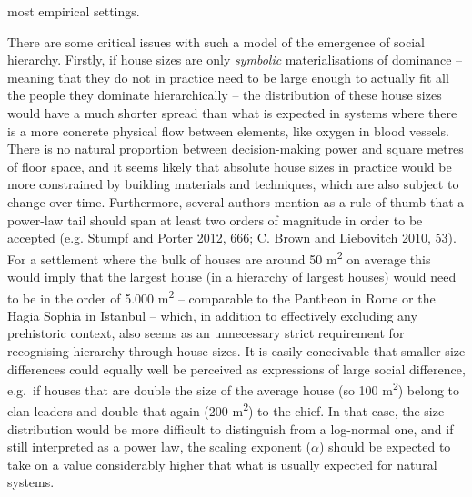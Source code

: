 \documentclass[
  12pt,
  a4paper, twoside]{book}
\begin{document}
most empirical settings.

There are some critical issues with such a model of the emergence of social hierarchy. Firstly, if house sizes are only \emph{symbolic} materialisations of dominance -- meaning that they do not in practice need to be large enough to actually fit all the people they dominate hierarchically -- the distribution of these house sizes would have a much shorter spread than what is expected in systems where there is a more concrete physical flow between elements, like oxygen in blood vessels. There is no natural proportion between decision-making power and square metres of floor space, and it seems likely that absolute house sizes in practice would be more constrained by building materials and techniques, which are also subject to change over time. Furthermore, several authors mention as a rule of thumb that a power-law tail should span at least two orders of magnitude in order to be accepted (e.g. Stumpf and Porter 2012, 666; C. Brown and Liebovitch 2010, 53). For a settlement where the bulk of houses are around 50 m\textsuperscript{2} on average this would imply that the largest house (in a hierarchy of largest houses) would need to be in the order of 5.000 m\textsuperscript{2} -- comparable to the Pantheon in Rome or the Hagia Sophia in Istanbul -- which, in addition to effectively excluding any prehistoric context, also seems as an unnecessary strict requirement for recognising hierarchy through house sizes. It is easily conceivable that smaller size differences could equally well be perceived as expressions of large social difference, e.g.~if houses that are double the size of the average house (so 100 m\textsuperscript{2}) belong to clan leaders and double that again (200 m\textsuperscript{2}) to the chief. In that case, the size distribution would be more difficult to distinguish from a log-normal one, and if still interpreted as a power law, the scaling exponent (\(\alpha\)) should be expected to take on a value considerably higher that what is usually expected for natural systems.
\end{document}
